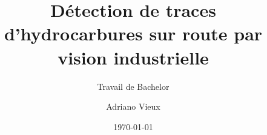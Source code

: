 \author{Adriano Vieux}


\title{Détection de traces d'hydrocarbures sur route par vision industrielle}

\subtitle{Travail de Bachelor}


\date{\today}


